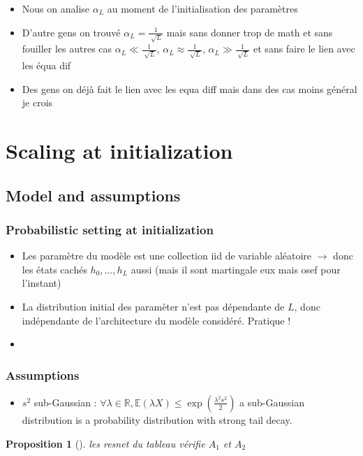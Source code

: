 \documentclass{article}
\theoremstyle{plain}%
\newtheorem{prop}[thm]{Proposition}
\theoremstyle{definition}
\theoremstyle{remark}
\begin{document}
\begin{itemize}
\begin{itemize}
        \item Nous on analise $ \alpha _L$ au moment de l'initialisation des paramètres 
        \item D'autre gens on trouvé $ \alpha _L = \frac{1}{\sqrt[]{L}} $ mais sans donner trop de math et sans fouiller les autres cas $ \alpha _L \ll \frac{1}{\sqrt[]{L}} $, $ \alpha _L \approx \frac{1}{\sqrt[]{L}} $, $ \alpha _L \gg \frac{1}{\sqrt[]{L}} $ et sans faire le lien avec les équa dif
        \item Des gens on déjà fait le lien avec les equa diff mais dans des cas moins général je crois
    \end{itemize}
\end{itemize}

\section{Scaling at initialization}
\subsection{Model and assumptions}
\subsubsection{Probabilistic setting at initialization }
\begin{itemize}
    \item Les paramètre du modèle est une collection iid de variable aléatoire $\rightarrow$ donc les états cachés $ h_0, \dots, h_L $ aussi (mais il sont martingale eux mais osef pour l'instant)
    \item La distribution initial des paramèter n'est pas dépendante de $ L $, donc indépendante de l'architecture du modèle considéré. Pratique !
    \item 
\end{itemize}

\subsubsection{Assumptions}
\begin{itemize}
    \item $ s^2 $ sub-Gaussian : $ \forall \lambda \in \mathbb{R}, \mathbb{E}(\lambda X) \leq  \exp (\frac{\lambda ^2 s^2 }{2})$  a sub-Gaussian distribution is a probability distribution with strong tail decay.
\end{itemize}

\begin{prop}[]
    les resnet du tableau vérifie $ A_1 $ et $ A_2 $ 
\end{prop}
\end{document}
